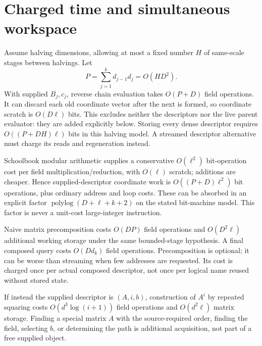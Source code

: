\documentclass[11pt]{article}
\begin{document}
\section*{Charged time and simultaneous workspace}
Assume halving dimensions, allowing at most a fixed number $H$ of
same-scale stages between halvings. Let
\[
 P=\sum_{j=1}^k d_{j-1}d_j=O(H D^2).
\]
With supplied $B_j,c_j$, reverse chain evaluation takes $O(P+D)$
field operations. It can discard each old coordinate vector after the
next is formed, so coordinate scratch is $O(D\ell)$ bits. This excludes
neither the descriptors nor the live parent evaluator: they are added
explicitly below. Storing every dense descriptor requires
$O((P+D H)\ell)$ bits in this halving model. A streamed descriptor
alternative must charge its reads and regeneration instead.

Schoolbook modular arithmetic supplies a conservative $O(\ell^2)$
bit-operation cost per field multiplication/reduction, with $O(\ell)$
scratch; additions are cheaper. Hence supplied-descriptor coordinate
work is $O((P+D)\ell^2)$ bit operations, plus ordinary address and loop
costs. These can be absorbed in an explicit factor
$\operatorname{polylog}(D+\ell+k+2)$ on the stated bit-machine model.
This factor is never a unit-cost large-integer instruction.

Naive matrix precomposition costs
$O(DP)$ field operations and $O(D^2\ell)$ additional working storage
under the same bounded-stage hypothesis. A final composed query costs
$O(Dd_k)$ field operations. Precomposition is optional; it can be worse
than streaming when few addresses are requested. Its cost is charged
once per actual composed descriptor, not once per logical name reused
without stored state.

If instead the supplied descriptor is $(A,i,b)$, construction of $A^i$
by repeated squaring costs $O(d^3\log(i+1))$ field operations and
$O(d^2\ell)$ matrix storage. Finding a special matrix $A$ with the
source-required order, finding the field, selecting $b$, or determining
the path is additional acquisition, not part of a free supplied object.
\end{document}
